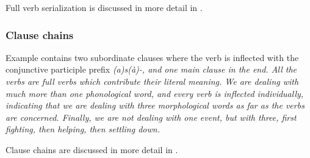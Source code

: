 
Full verb serialization is discussed in more detail in .

\subsubsection{Clause chains}\label{sec:wc:mvc:Clausechains}
Example  contains two subordinate clauses where the verb is inflected with the conjunctive participle prefix \em (a)s(à)-\em, and one main clause in the end. All the verbs are full verbs which contribute their literal meaning. We are dealing with much more than one phonological word, and every verb is inflected individually, indicating that we are dealing with three morphological words as far as the verbs are concerned. Finally, we are not dealing with one event, but with three, first fighting, then helping, then settling down.


Clause chains are discussed in more detail in . 



